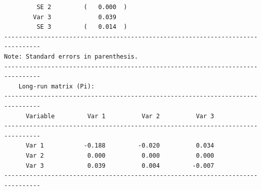 \documentclass[article]{jss}
\begin{document}
\begin{verbatim}
         SE 2         (   0.000  )  
        Var 3             0.039     
         SE 3         (   0.014  )  
--------------------------------------------------------------------------------
Note: Standard errors in parenthesis.                                                                
--------------------------------------------------------------------------------
    Long-run matrix (Pi):                                                                       
--------------------------------------------------------------------------------
      Variable         Var 1          Var 2          Var 3   
--------------------------------------------------------------------------------
      Var 1           -0.188         -0.020          0.034    
      Var 2            0.000          0.000          0.000    
      Var 3            0.039          0.004         -0.007    
--------------------------------------------------------------------------------


\end{verbatim}
\end{document}
